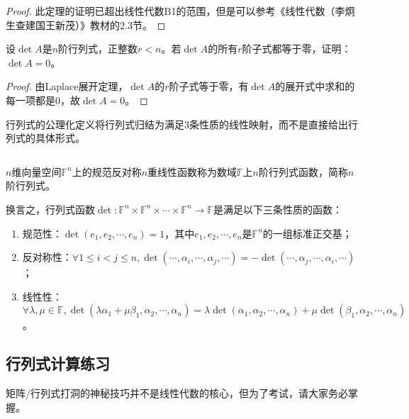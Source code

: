             \begin{proof}
                此定理的证明已超出线性代数B1的范围，但是可以参考《线性代数（李炯生\quad 查建国\quad 王新茂）》教材的2.3节。
            \end{proof}

            \begin{example}
                设$\det A$是$n$阶行列式，正整数$r<n$。若$\det A$的所有$r$阶子式都等于零，证明：$\det A=0$。
            \end{example}

            \begin{proof}
                由Laplace展开定理，$\det A$的$r$阶子式等于零，有$\det A$的展开式中求和的每一项都是$0$，故$\det A=0$。
            \end{proof}

            行列式的公理化定义将行列式归结为满足3条性质的线性映射，而不是直接给出行列式的具体形式。

            $ $

            \begin{definition}[公理化定义]
                $n$维向量空间$\mathbb{F}^n$上的规范反对称$n$重线性函数称为数域$\mathbb{F}$上$n$阶行列式函数，简称$n$阶行列式。

                换言之，行列式函数$\det:\mathbb{F}^{n}\times\mathbb{F}^{n}\times\cdots\times\mathbb{F}^{n}\rightarrow\mathbb{F}$是满足以下三条性质的函数：
                \begin{enumerate}
                    \item 规范性：$\det(e_1,e_2,\cdots,e_n)=1$，其中$e_1,e_2,\cdots,e_n$是$\mathbb{F}^n$的一组标准正交基；
                    \item 反对称性：$\forall 1\leq i<j\leq n,\det(\cdots,\alpha_i,\cdots,\alpha_j,\cdots)=-\det(\cdots,\alpha_j,\cdots,\alpha_i,\cdots)$；
                    \item 线性性：$\forall \lambda,\mu\in\mathbb{F},\det(\lambda\alpha_1+\mu\beta_1,\alpha_2,\cdots,\alpha_n)=\lambda\det(\alpha_1,\alpha_2,\cdots,\alpha_n)+\mu\det(\beta_1,\alpha_2,\cdots,\alpha_n)$。
                \end{enumerate}
            \end{definition}

        \subsection{行列式计算练习}

            矩阵/行列式打洞的神秘技巧并不是线性代数的核心，但为了考试，请大家务必掌握。

